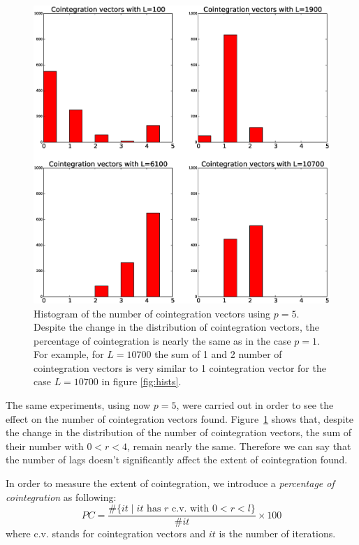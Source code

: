 \begin{figure}[!h]
  \centering
  \includegraphics[width=\textwidth]{img/histCointVectorsp5}
  \caption{Histogram of the number of cointegration vectors using $p=5$. 
   Despite the change in the distribution of cointegration vectors, 
   the percentage of cointegration is nearly the same as in the case $p=1$. 
   For example, for $L=10700$ the sum of 1 and 2 number of cointegration
   vectors is very similar to 1 cointegration vector for the case $L=10700$
   in figure \ref{fig:hists}.}
   \label{fig:histsp5}
\end{figure}

The same experiments, using now $p=5$, were carried out in order to see the
effect on the number of cointegration vectors found. 
Figure~\ref{fig:histsp5} shows that, despite the change in the distribution
of the number of cointegration vectors, the sum of their number with $0<r<4$,
remain nearly the same. 
Therefore we can say that the number of lags doesn't significantly affect
the extent of cointegration found.

In order to measure the extent of cointegration, we introduce a
{\em percentage of cointegration\/} as following:
\begin{equation} \label{eq:pcoint}
PC = 
\frac{\#\{ it \mid \text{$it$ has $r$ c.v. with $0<r<l$}\}}
     {\#it}\times 100
\end{equation}
where c.v. stands for cointegration vectors and $it$ is the number of iterations.

